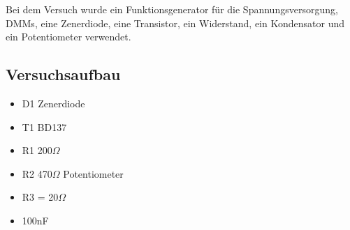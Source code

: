\documentclass[12pt,a4paper]{article}
\begin{document}
Bei dem Versuch wurde ein Funktionsgenerator für die Spannungsversorgung, DMMs, eine Zenerdiode, eine Transistor, ein Widerstand, ein Kondensator und ein Potentiometer verwendet.

\subsection{Versuchsaufbau}

\begin{itemize}
\item	D1 Zenerdiode

\item	T1 BD137

\item	R1 200$\Omega$

\item	R2 470$\Omega$ Potentiometer

\item	R3 = 20$\Omega$

\item	100nF
\end{itemize}
\end{document}
